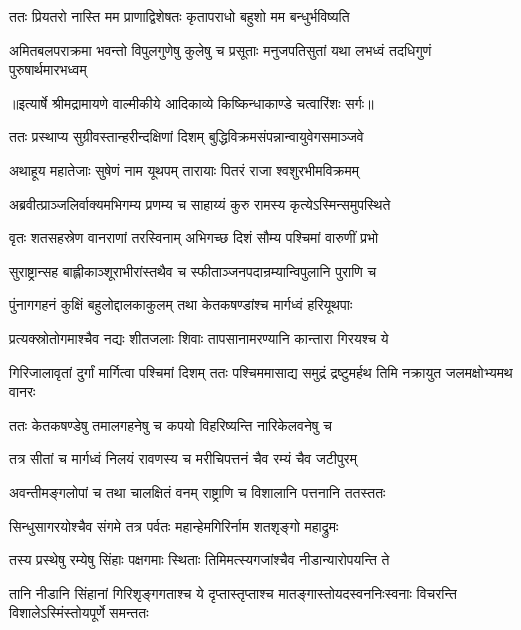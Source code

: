\twolineshloka
{ततः प्रियतरो नास्ति मम प्राणाद्विशेषतः}
{कृतापराधो बहुशो मम बन्धुर्भविष्यति} %

\fourlineindentedshloka
{अमितबलपराक्रमा भवन्तो}
{ विपुलगुणेषु कुलेषु च प्रसूताः}
{मनुजपतिसुतां यथा लभध्वं}
{ तदधिगुणं पुरुषार्थमारभध्वम्} %


{॥इत्यार्षे श्रीमद्रामायणे वाल्मीकीये आदिकाव्ये किष्किन्धाकाण्डे चत्वारिंशः सर्गः॥}


\twolineshloka
{ततः प्रस्थाप्य सुग्रीवस्तान्हरीन्दक्षिणां दिशम्}
{बुद्धिविक्रमसंपन्नान्वायुवेगसमाञ्जवे} %

\twolineshloka
{अथाहूय महातेजाः सुषेणं नाम यूथपम्}
{तारायाः पितरं राजा श्वशुरभीमविक्रमम्} %

\twolineshloka
{अब्रवीत्प्राञ्जलिर्वाक्यमभिगम्य प्रणम्य च}
{साहाय्यं कुरु रामस्य कृत्येऽस्मिन्समुपस्थिते} %

\twolineshloka
{वृतः शतसहस्रेण वानराणां तरस्विनाम्}
{अभिगच्छ दिशं सौम्य पश्चिमां वारुणीं प्रभो} %

\twolineshloka
{सुराष्ट्रान्सह बाह्लीकाञ्शूराभीरांस्तथैव च}
{स्फीताञ्जनपदान्रम्यान्विपुलानि पुराणि च} %

\twolineshloka
{पुंनागगहनं कुक्षिं बहुलोद्दालकाकुलम्}
{तथा केतकषण्डांश्च मार्गध्वं हरियूथपाः} %

\twolineshloka
{प्रत्यक्स्रोतोगमाश्चैव नद्यः शीतजलाः शिवाः}
{तापसानामरण्यानि कान्तारा गिरयश्च ये} %

\threelineshloka
{गिरिजालावृतां दुर्गां मार्गित्वा पश्चिमां दिशम्}
{ततः पश्चिममासाद्य समुद्रं द्रष्टुमर्हथ}
{तिमि नक्रायुत जलमक्षोभ्यमथ वानरः} %

\twolineshloka
{ततः केतकषण्डेषु तमालगहनेषु च}
{कपयो विहरिष्यन्ति नारिकेलवनेषु च} %

\twolineshloka
{तत्र सीतां च मार्गध्वं निलयं रावणस्य च}
{मरीचिपत्तनं चैव रम्यं चैव जटीपुरम्} %

\twolineshloka
{अवन्तीमङ्गलोपां च तथा चालक्षितं वनम्}
{राष्ट्राणि च विशालानि पत्तनानि ततस्ततः} %

\twolineshloka
{सिन्धुसागरयोश्चैव संगमे तत्र पर्वतः}
{महान्हेमगिरिर्नाम शतशृङ्गो महाद्रुमः} %

\twolineshloka
{तस्य प्रस्थेषु रम्येषु सिंहाः पक्षगमाः स्थिताः}
{तिमिमत्स्यगजांश्चैव नीडान्यारोपयन्ति ते} %

\threelineshloka
{तानि नीडानि सिंहानां गिरिशृङ्गगताश्च ये}
{दृप्तास्तृप्ताश्च मातङ्गास्तोयदस्वननिःस्वनाः}
{विचरन्ति विशालेऽस्मिंस्तोयपूर्णे समन्ततः} %

